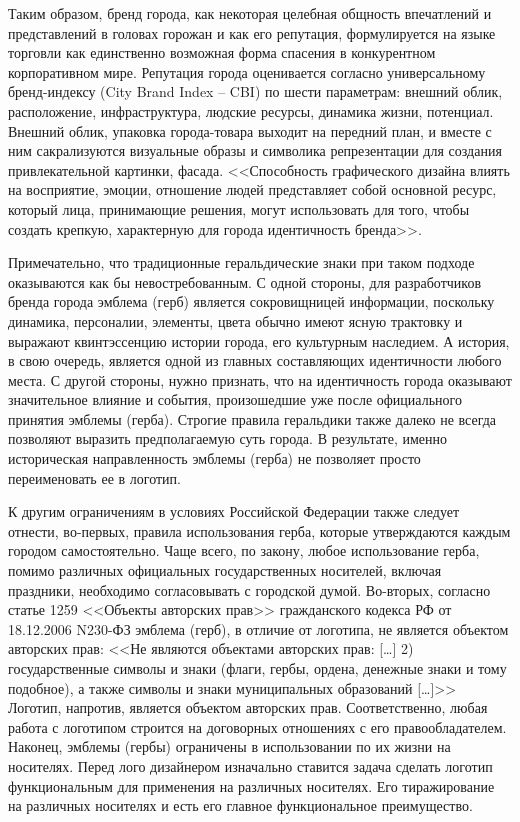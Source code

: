 Таким образом, бренд города, как некоторая  целебная общность впечатлений и представлений в головах
горожан и как его репутация, формулируется на языке торговли  как единственно возможная форма
спасения в конкурентном корпоративном мире. Репутация города оценивается согласно универсальному
бренд-индексу (City Brand Index -- CBI) по шести параметрам: внешний облик, расположение,
инфраструктура, людские ресурсы, динамика жизни, потенциал. Внешний облик, упаковка города-товара
выходит на передний план,  и вместе с ним сакрализуются визуальные образы и символика репрезентации
для создания привлекательной картинки, фасада. <<Способность графического дизайна влиять на
восприятие, эмоции, отношение людей представляет собой основной ресурс, который лица, принимающие
решения, могут использовать для того, чтобы создать крепкую, характерную для города идентичность
бренда>>. \autocite[][267]{book:dinni}

Примечательно, что традиционные геральдические знаки при таком подходе оказываются как бы
невостребованным. С одной стороны, для разработчиков бренда города эмблема (герб) является
сокровищницей информации, поскольку динамика, персоналии, элементы, цвета обычно имеют ясную
трактовку и выражают квинтэссенцию истории города, его культурным наследием. А история, в свою
очередь, является одной из главных составляющих идентичности любого места. С другой стороны, нужно
признать, что на идентичность города оказывают значительное влияние и события, произошедшие уже
после официального принятия эмблемы (герба). Строгие правила геральдики также далеко не всегда
позволяют выразить предполагаемую суть города. В результате, именно историческая направленность
эмблемы (герба) не позволяет просто переименовать ее  в логотип.

К другим ограничениям в условиях Российской Федерации также следует отнести, во-первых, правила
использования герба, которые утверждаются каждым городом самостоятельно. Чаще всего, по закону,
любое использование герба, помимо различных официальных государственных носителей, включая
праздники, необходимо согласовывать с городской думой.  Во-вторых, согласно статье 1259 <<Объекты
авторских прав>> гражданского кодекса РФ от 18.12.2006 N230-ФЗ  эмблема (герб), в отличие от
логотипа, не является объектом авторских прав: <<Не являются объектами авторских прав: [\ldots] 2)
государственные символы и знаки (флаги, гербы, ордена, денежные знаки и тому подобное), а также
символы и знаки муниципальных образований [\ldots]>> Логотип,
напротив, является объектом авторских прав. Соответственно, любая работа с логотипом строится на
договорных отношениях с его правообладателем. Наконец, эмблемы (гербы) ограничены в использовании по
их жизни на носителях. Перед лого дизайнером изначально ставится задача сделать логотип
функциональным для применения на различных носителях. Его тиражирование на различных носителях и
есть его главное функциональное преимущество.

